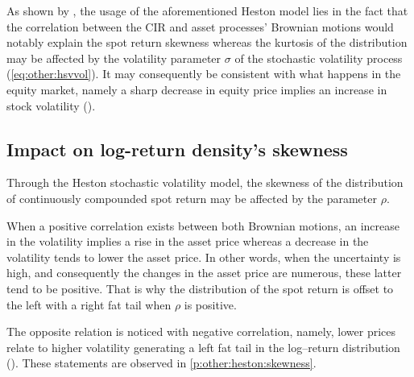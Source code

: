 \documentclass[12pt,a4paper]{report}
\begin{document}
As shown by \citet{heston1993}, the usage of the aforementioned Heston model lies in the fact that the correlation between the CIR and asset processes' Brownian motions would notably explain the spot return skewness whereas the kurtosis of the distribution may be affected by the volatility parameter $\sigma$ of the stochastic volatility process (\cref{eq:other:hsvvol}).
It may consequently be consistent with what happens in the equity market, namely a sharp decrease in equity price implies an increase in stock volatility (\citet{criso2015}).




\subsection{Impact on log-return density's skewness}
\label{sub:hestonskewness}

Through the Heston stochastic volatility model, the skewness of the distribution of continuously compounded spot return may be affected by the parameter $\rho$. 

When a positive correlation exists between both Brownian motions, an increase in the volatility implies a rise in the asset price whereas a decrease in the volatility tends to lower the asset price.
In other words, when the uncertainty is high, and consequently the changes in the asset price are numerous, these latter tend to be positive. 
That is why the distribution of the spot return is offset to the left with a right fat tail when $\rho$ is positive.

The opposite relation is noticed with negative correlation, namely, lower prices relate to higher volatility generating a left fat tail in the log–return distribution (\citet{heston1993}).
These statements are observed in \cref{p:other:heston:skewness}.
\end{document}
